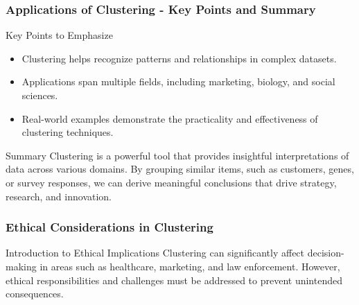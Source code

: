 \documentclass[aspectratio=169]{beamer}
\begin{document}
\begin{frame}[fragile]
    \frametitle{Applications of Clustering - Key Points and Summary}
    \begin{block}{Key Points to Emphasize}
        \begin{itemize}
            \item Clustering helps recognize patterns and relationships in complex datasets.
            \item Applications span multiple fields, including marketing, biology, and social sciences.
            \item Real-world examples demonstrate the practicality and effectiveness of clustering techniques.
        \end{itemize}
    \end{block}
    
    \begin{block}{Summary}
        Clustering is a powerful tool that provides insightful interpretations of data across various domains. By grouping similar items, such as customers, genes, or survey responses, we can derive meaningful conclusions that drive strategy, research, and innovation.
    \end{block}
\end{frame}

\begin{frame}[fragile]
    \frametitle{Ethical Considerations in Clustering}
    \begin{block}{Introduction to Ethical Implications}
        Clustering can significantly affect decision-making in areas such as healthcare, marketing, and law enforcement. However, ethical responsibilities and challenges must be addressed to prevent unintended consequences.
    \end{block}
\end{frame}
\end{document}
